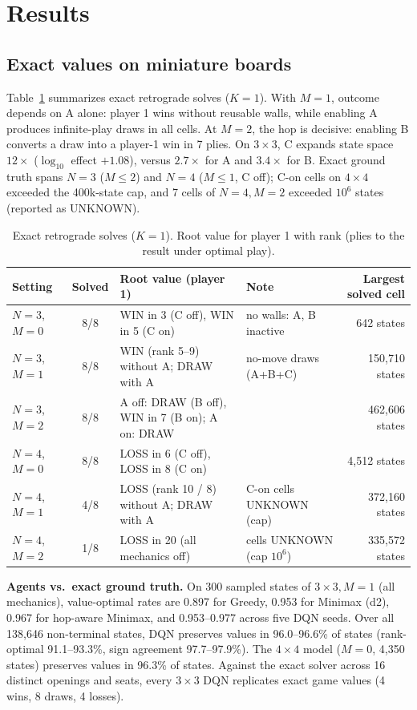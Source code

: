 \documentclass[10pt]{article}
\begin{document}
\section{Results}\label{sec:results}\subsection{Exact values on miniature boards}
Table~\ref{tab:solve} summarizes exact retrograde solves ($K=1$). With $M=1$, outcome depends on A alone: player 1 wins without reusable walls, while enabling A produces infinite-play draws in all cells. At $M=2$, the hop is decisive: enabling B converts a draw into a player-1 win in 7 plies. On $3\times3$, C expands state space $12\times$ ($\log_{10}$ effect $+1.08$), versus $2.7\times$ for A and $3.4\times$ for B. Exact ground truth spans $N=3$ ($M\le 2$) and $N=4$ ($M\le 1$, C off); C-on cells on $4\times4$ exceeded the 400k-state cap, and 7 cells of $N=4, M=2$ exceeded $10^6$ states (reported as UNKNOWN).

\begin{table}[!tb]
\centering\small
\caption{Exact retrograde solves ($K=1$). Root value for player 1 with rank (plies to the result under optimal play).}
\label{tab:solve}
\begin{tabular}{lc>{\raggedright\arraybackslash}p{5.6cm}>{\raggedright\arraybackslash}p{3.9cm}r}
\toprule
Setting & Solved & Root value (player 1) & Note & Largest solved cell\\
\midrule
$N=3$, $M=0$ & 8/8 & WIN in 3 (C off), WIN in 5 (C on) & no walls: A, B inactive & 642 states\\
$N=3$, $M=1$ & 8/8 & WIN (rank 5--9) without A; DRAW with A & 48 no-move draws (A+B+C) & 150{,}710 states\\
$N=3$, $M=2$ & 8/8 & A off: DRAW (B off), WIN in 7 (B on); A on: DRAW & & 462{,}606 states\\
$N=4$, $M=0$ & 8/8 & LOSS in 6 (C off), LOSS in 8 (C on) & & 4{,}512 states\\
$N=4$, $M=1$ & 4/8 & LOSS (rank 10 / 8) without A; DRAW with A & C-on cells UNKNOWN (cap) & 372{,}160 states\\
$N=4$, $M=2$ & 1/8 & LOSS in 20 (all mechanics off) & 7 cells UNKNOWN (cap $10^6$) & 335{,}572 states\\
\bottomrule
\end{tabular}
\end{table}

\textbf{Agents vs.\ exact ground truth.} On 300 sampled states of $3\times3, M=1$ (all mechanics), value-optimal rates are 0.897 for Greedy, 0.953 for Minimax (d2), 0.967 for hop-aware Minimax, and 0.953--0.977 across five DQN seeds. Over all 138{,}646 non-terminal states, DQN preserves values in 96.0--96.6\% of states (rank-optimal 91.1--93.3\%, sign agreement 97.7--97.9\%). The $4\times4$ model ($M=0$, 4{,}350 states) preserves values in 96.3\% of states. Against the exact solver across 16 distinct openings and seats, every $3\times3$ DQN replicates exact game values (4 wins, 8 draws, 4 losses).
\end{document}
